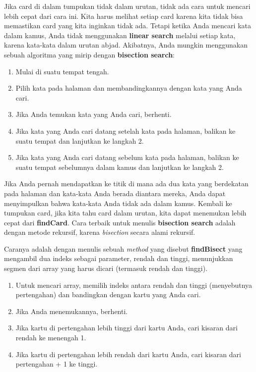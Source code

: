 \documentclass[12pt,b5paper,openright,twoside]{book}
\begin{document}
\noindent Jika card di dalam tumpukan tidak dalam urutan, tidak ada cara untuk mencari lebih cepat dari cara ini. Kita harus melihat setiap card karena kita tidak bisa memastikan card yang kita inginkan tidak ada. Tetapi ketika Anda mencari kata dalam kamus, Anda tidak menggunakan \textbf{linear search} melalui setiap kata, karena kata-kata dalam urutan abjad. Akibatnya, Anda mungkin menggunakan sebuah algoritma yang mirip dengan \textbf{bisection search}:
\begin{enumerate}
    \item Mulai di suatu tempat tengah.
    \item Pilih kata pada halaman dan membandingkannya dengan kata yang Anda cari.
    \item Jika Anda temukan kata yang Anda cari, berhenti.
    \item Jika kata yang Anda cari datang setelah kata pada halaman, balikan ke suatu tempat dan lanjutkan ke langkah 2.
    \item Jika kata yang Anda cari datang sebelum kata pada halaman, balikan ke suatu tempat sebelumnya dalam kamus dan lanjutkan ke langkah 2.
\end{enumerate}

\noindent Jika Anda pernah mendapatkan ke titik di mana ada dua kata yang berdekatan pada halaman dan kata-kata Anda berada diantara mereka, Anda dapat menyimpulkan bahwa kata-kata Anda tidak ada dalam kamus.
Kembali ke tumpukan card, jika kita tahu card dalam urutan, kita dapat menemukan lebih cepat dari \textbf{findCard}. Cara terbaik untuk menulis \textbf{bisection search} adalah dengan metode rekursif, karena \textit{bisection} secara alami rekursif.

\noindent Caranya adalah dengan menulis sebuah \textit{method} yang disebut \textbf{findBisect} yang mengambil dua indeks sebagai parameter, rendah dan tinggi, menunjukkan segmen dari array yang harus dicari (termasuk rendah dan tinggi).
\begin{enumerate}
    \item Untuk mencari array, memilih indeks antara rendah dan tinggi (menyebutnya pertengahan) dan bandingkan dengan kartu yang Anda cari.
    \item Jika Anda menemukannya, berhenti.
    \item Jika kartu di pertengahan lebih tinggi dari kartu Anda, cari kisaran dari rendah ke menengah 1.
    \item Jika kartu di pertengahan lebih rendah dari kartu Anda, cari kisaran dari pertengahan + 1 ke tinggi.
\end{enumerate}
\end{document}
